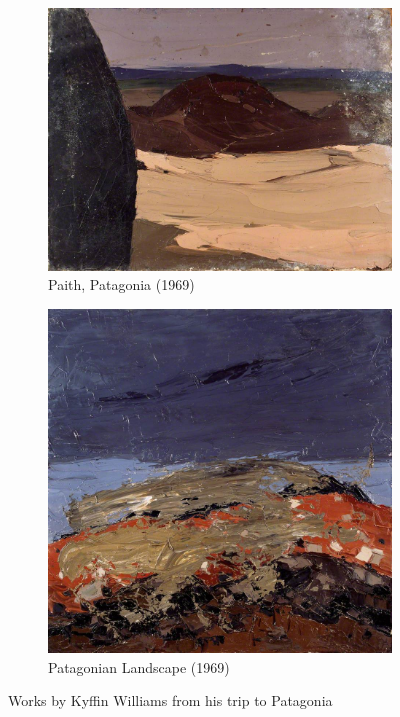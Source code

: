 \documentclass[11pt,fleqn,twoside]{article}
\begin{document}
\begin{figure}[h]
\centering
\begin{subfigure}[b]{0.4\textwidth}
  \centering
  \includegraphics[width=\textwidth]{img/nlw_nlw_kwf00325_large.jpg}
  \caption{Paith, Patagonia (1969)}
\end{subfigure}
\begin{subfigure}[b]{0.4\textwidth}
  \centering
  \includegraphics[width=\textwidth]{img/nlw_nlw_kwf00103_large.jpg}
  \caption{Patagonian Landscape (1969)}
\end{subfigure}
\caption{Works by Kyffin Williams from his trip to Patagonia}
\label{fig:kyffin-patagonia}
\end{figure}
\end{document}
